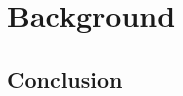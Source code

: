 \chapter{Background}   \label{ch:background}
\graphicspath{{Background/figures/}}

\section{Conclusion}   \label{sec:conclusion}


